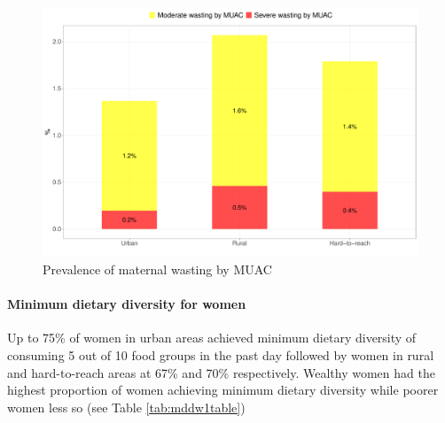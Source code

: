 \documentclass[12pt,a4paper]{article}
\let\oldparagraph\paragraph
\renewcommand{\paragraph}[1]{\oldparagraph{#1}\mbox{}}
\begin{document}
\begin{figure}[H]

{\centering \includegraphics{kayinReport_files/figure-latex/mMuacPlot-1} 

}

\caption{Prevalence of maternal wasting by MUAC}\label{fig:mMuacPlot}
\end{figure}

\hypertarget{mddw}{%
\paragraph{Minimum dietary diversity for women}\label{mddw}}

Up to 75\% of women in urban areas achieved minimum dietary diversity of consuming 5 out of 10 food groups in the past day followed by women in rural and hard-to-reach areas at 67\% and 70\% respectively. Wealthy women had the highest proportion of women achieving minimum dietary diversity while poorer women less so (see Table \ref{tab:mddw1table})
\end{document}
